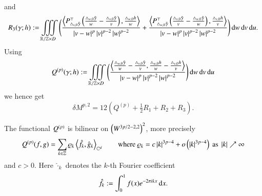 and
\begin{align*}
 R_3 (\gamma;h) :=   \iiint\limits_{\mathbb R / \mathbb Z \times D } \Bigg( \frac{\sp{P^{\top}_{\T v0}
\left( \frac{ \T w0 } w - \frac{ \T v0 } v \right),\frac{\T[h] w0}w}}{\abs{v-w}^p\abs{v}^{p-2}\abs{w}^{p-2}}
+
 \frac{\sp{P^{\top}_{\T w0}\left(\frac {\T v0}{v} -\frac {\T w0}{w}\right) ,\frac{\T[h] v0}v}}{\abs{v-w}^p\abs{v}^{p-2}\abs{w}^{p-2}}
 \Bigg)\d w \d v \d u.
\end{align*}
Using
\begin{align*}
 Q^{(p)}(\gamma;h) :=   \iiint\limits_{\mathbb R / \mathbb Z \times D } \Bigg( \frac{\sp{\frac {\T w0}{w}
- \frac {\T v0}{v},\frac{\T[h] w0}{w}-\frac{\T[h] v0}{v}}}{\abs{v-w}^p\abs{v}^{p-2}\abs{w}^{p-2}}
 \Bigg)\d w \d v \d u
\end{align*}
we hence get
\begin{equation}\label{eq:Re}
 \delta M^{p,2} = 12 \left( Q^{(p)} + \tfrac12R_1 +R_2 + R_3  \right).
\end{equation}


\begin{proposition}\label{prop:Q}
 The functional $\Q$ is bilinear on $\br{\W[3p/2-2,2]}^{2}$, more precisely
 \[ \Q(f,g) = \sum_{k\in\Z} \rho_k\sp{\hat f_k,\hat g_k}_{\C^d} \qquad \text{where } \rho_k = c\abs k^{3p-4} + o\br{\abs k^{3p-4}} \text{ as }\abs k\nearrow\infty \]
 and $c>0$.
 Here $\hat\cdot_k$ denotes the $k$-th Fourier coefficient
 \[
  \hat f_k := \int_{0}^1 f(x) e^{-2\pi ikx } \d x.
 \]
\end{proposition}

